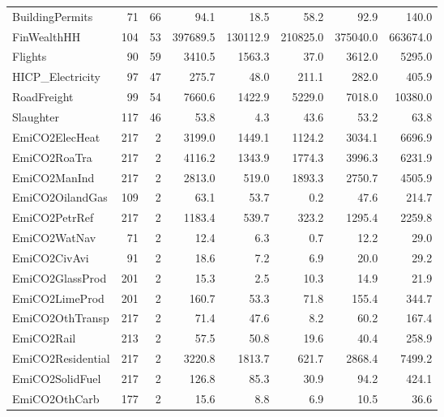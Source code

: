 {\begin{tabular}[t]{lrrrrrrr}
BuildingPermits & 71 & 66 & \num{94.1} & \num{18.5} & \num{58.2} & \num{92.9} & \num{140.0}\\
FinWealthHH & 104 & 53 & \num{397689.5} & \num{130112.9} & \num{210825.0} & \num{375040.0} & \num{663674.0}\\
Flights & 90 & 59 & \num{3410.5} & \num{1563.3} & \num{37.0} & \num{3612.0} & \num{5295.0}\\
HICP\_Electricity & 97 & 47 & \num{275.7} & \num{48.0} & \num{211.1} & \num{282.0} & \num{405.9}\\
RoadFreight & 99 & 54 & \num{7660.6} & \num{1422.9} & \num{5229.0} & \num{7018.0} & \num{10380.0}\\
Slaughter & 117 & 46 & \num{53.8} & \num{4.3} & \num{43.6} & \num{53.2} & \num{63.8}\\
EmiCO2ElecHeat & 217 & 2 & \num{3199.0} & \num{1449.1} & \num{1124.2} & \num{3034.1} & \num{6696.9}\\
EmiCO2RoaTra & 217 & 2 & \num{4116.2} & \num{1343.9} & \num{1774.3} & \num{3996.3} & \num{6231.9}\\
EmiCO2ManInd & 217 & 2 & \num{2813.0} & \num{519.0} & \num{1893.3} & \num{2750.7} & \num{4505.9}\\
EmiCO2OilandGas & 109 & 2 & \num{63.1} & \num{53.7} & \num{0.2} & \num{47.6} & \num{214.7}\\
EmiCO2PetrRef & 217 & 2 & \num{1183.4} & \num{539.7} & \num{323.2} & \num{1295.4} & \num{2259.8}\\
EmiCO2WatNav & 71 & 2 & \num{12.4} & \num{6.3} & \num{0.7} & \num{12.2} & \num{29.0}\\
EmiCO2CivAvi & 91 & 2 & \num{18.6} & \num{7.2} & \num{6.9} & \num{20.0} & \num{29.2}\\
EmiCO2GlassProd & 201 & 2 & \num{15.3} & \num{2.5} & \num{10.3} & \num{14.9} & \num{21.9}\\
EmiCO2LimeProd & 201 & 2 & \num{160.7} & \num{53.3} & \num{71.8} & \num{155.4} & \num{344.7}\\
EmiCO2OthTransp & 217 & 2 & \num{71.4} & \num{47.6} & \num{8.2} & \num{60.2} & \num{167.4}\\
EmiCO2Rail & 213 & 2 & \num{57.5} & \num{50.8} & \num{19.6} & \num{40.4} & \num{258.9}\\
EmiCO2Residential & 217 & 2 & \num{3220.8} & \num{1813.7} & \num{621.7} & \num{2868.4} & \num{7499.2}\\
EmiCO2SolidFuel & 217 & 2 & \num{126.8} & \num{85.3} & \num{30.9} & \num{94.2} & \num{424.1}\\
EmiCO2OthCarb & 177 & 2 & \num{15.6} & \num{8.8} & \num{6.9} & \num{10.5} & \num{36.6}\\

\end{tabular}}
